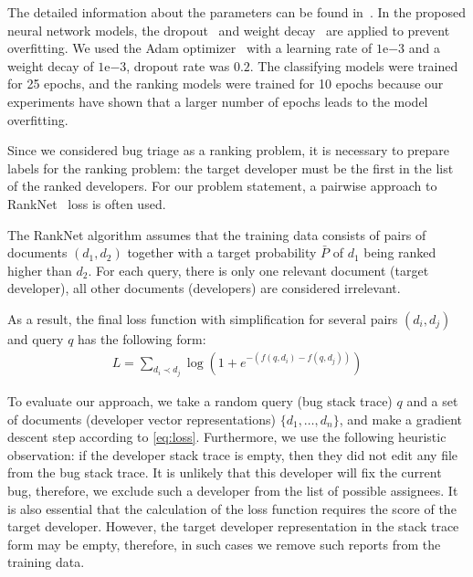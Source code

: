 The detailed information about the parameters can be found in~.
In the proposed neural network models, the dropout~\cite{Srivastava2014DropoutAS} and weight decay~\cite{Loshchilov2019DecoupledWD} are applied to prevent overfitting. We used the Adam optimizer~\cite{Kingma2015AdamAM} with a learning rate of $1\mathrm{e}{-3}$ and a weight decay of $1\mathrm{e}{-3}$, dropout rate was $0.2$. The classifying models were trained for 25 epochs, and the ranking models were trained for 10 epochs because our experiments have shown that a larger number of epochs leads to the model overfitting.


Since we considered bug triage as a ranking problem, it is necessary to prepare labels for the ranking problem: the target developer must be the first in the list of the ranked developers. For our problem statement, a pairwise approach to RankNet~\cite{Burges2005LearningTR} loss is often used.

The RankNet algorithm assumes that the training data consists of pairs of documents $(d_1, d_2)$ together with a target probability $\bar{P}$ of $d_1$ being ranked higher than $d_2$. For each query, there is only one relevant document (target developer), all other documents (developers) are considered irrelevant. 

As a result, the final loss function with simplification for several pairs $(d_i, d_j)$ and query $q$ has the following form: 
\begin{align}\label{eq:loss}
    L = \sum_{d_i \prec d_j} \log{\left (1 + e^{-(f(q, d_i) - f(q, d_j))} \right)}
\end{align}

To evaluate our approach, we take a random query (bug stack trace) $q$ and a set of documents (developer vector representations) $\{d_1, \ldots, d_n \}$, 
and make a gradient descent step according to \eqref{eq:loss}.
Furthermore, we use the following heuristic observation: if the developer stack trace is empty, then they did not edit any file from the bug stack trace. It is unlikely that this developer will fix the current bug, therefore, we exclude such a developer from the list of possible assignees. It is also essential that the calculation of the loss function requires the score of the target developer. However, the target developer representation in the stack trace form may be empty, therefore, in such cases we remove such reports from the training data.

